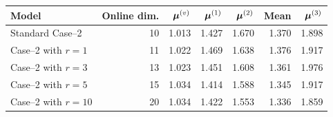 \begin{tabular}{lrrrrrr}
\toprule
Model & Online dim. & $\bm\mu^{(v)}$ & $\bm\mu^{(1)}$ & $\bm\mu^{(2)}$ & Mean & $\bm\mu^{(3)}$ \\
\midrule
Standard Case--2 & 10 & 1.013 & 1.427 & 1.670 & 1.370 & 1.898 \\
Case--2 with $r=1$ & 11 & 1.022 & 1.469 & 1.638 & 1.376 & 1.917 \\
Case--2 with $r=3$ & 13 & 1.023 & 1.451 & 1.608 & 1.361 & 1.976 \\
Case--2 with $r=5$ & 15 & 1.034 & 1.414 & 1.588 & 1.345 & 1.917 \\
Case--2 with $r=10$ & 20 & 1.034 & 1.422 & 1.553 & 1.336 & 1.859 \\
\bottomrule
\end{tabular}
